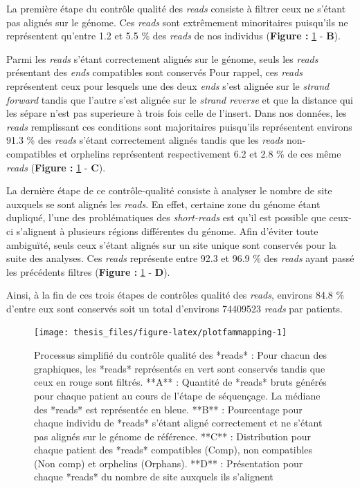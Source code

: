 \documentclass[12pt,twoside]{reedthesis}
\theoremstyle{definition}
\theoremstyle{definition}
\theoremstyle{remark}
\begin{document}
  La première étape du contrôle qualité des \emph{reads} consiste à
  filtrer ceux ne s'étant pas alignés sur le génome. Ces \emph{reads} sont
  extrêmement minoritaires puisqu'ils ne représentent qu'entre 1.2 et 5.5
  \% des \emph{reads} de nos individus (\textbf{Figure :
  }\ref{fig:plotfammapping} - \textbf{B}).
  
  Parmi les \emph{reads} s'étant correctement alignés sur le génome, seuls
  les \emph{reads} présentant des \emph{ends} compatibles sont conservés
  Pour rappel, ces \emph{reads} représentent ceux pour lesquels une des
  deux \emph{ends} s'est alignée sur le \emph{strand forward} tandis que
  l'autre s'est alignée sur le \emph{strand reverse} et que la distance
  qui les sépare n'est pas superieure à trois fois celle de l'insert. Dans
  nos données, les \emph{reads} remplissant ces conditions sont
  majoritaires puisqu'ils représentent environs 91.3 \% des \emph{reads}
  s'étant correctement alignés tandis que les \emph{reads} non-compatibles
  et orphelins représentent respectivement 6.2 et 2.8 \% de ces même
  \emph{reads} (\textbf{Figure : }\ref{fig:plotfammapping} - \textbf{C}).
  
  La dernière étape de ce contrôle-qualité consiste à analyser le nombre
  de site auxquels se sont alignés les \emph{reads}. En effet, certaine
  zone du génome étant dupliqué, l'une des problématiques des
  \emph{short-reads} est qu'il est possible que ceux-ci s'alignent à
  plusieurs régions différentes du génome. Afin d'éviter toute ambiguïté,
  seuls ceux s'étant alignés sur un site unique sont conservés pour la
  suite des analyses. Ces \emph{reads} représente entre 92.3 et 96.9 \%
  des \emph{reads} ayant passé les précédents filtres (\textbf{Figure :
  }\ref{fig:plotfammapping} - \textbf{D}).
  
  Ainsi, à la fin de ces trois étapes de contrôles qualité des
  \emph{reads}, environs 84.8 \% d'entre eux sont conservés soit un total
  d'environs 74409523 \emph{reads} par patients.
  
  \newpage 
  
  \begin{figure}
  
  {\centering \texttt{[image: thesis\_files/figure-latex/plotfammapping-1]} 
  
  }
  
  \caption[Processus simplifié du contrôle qualité des *reads*]{Processus simplifié du contrôle qualité des *reads* : Pour chacun des graphiques, les *reads* représentés en vert sont conservés tandis que ceux en rouge sont filtrés. **A** : Quantité de *reads* bruts générés pour chaque patient au cours de l'étape de séquençage. La médiane des *reads* est représentée en bleue. **B** : Pourcentage pour chaque individu de *reads* s'étant aligné correctement et ne s'étant pas alignés sur le génome de référence. **C** : Distribution pour chaque patient des *reads* compatibles (Comp), non compatibles (Non comp) et orphelins (Orphans). **D** : Présentation pour chaque *reads* du nombre de site auxquels ils s'alignent}\label{fig:plotfammapping}
  \end{figure}
  
\end{document}
